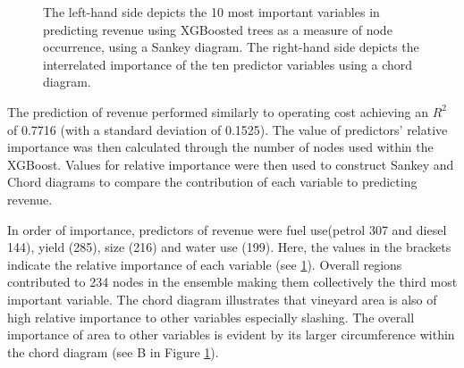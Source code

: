 \documentclass[review,12pt,authoryear]{elsarticle}
\begin{document}
\begin{linenumbers}
 \begin{figure}
  \caption{The left-hand side depicts the 10 most important variables in predicting revenue using XGBoosted trees as a measure of node occurrence, using a Sankey diagram. The right-hand side depicts the interrelated importance of the ten predictor variables using a chord diagram.}\label{fig:revenue_sankey}
 \end{figure}

The prediction of revenue performed similarly to operating cost achieving an $R^2$ of 0.7716 (with a standard deviation of 0.1525). The value of predictors' relative importance was then calculated through the number of nodes used within the XGBoost. Values for relative importance were then used to construct Sankey and Chord diagrams to compare the contribution of each variable to predicting revenue.
\par
In order of importance, predictors of revenue were fuel use(petrol 307 and diesel 144), yield (285), size (216) and water use (199). Here, the values in the brackets indicate the relative importance of each variable (see \ref{fig:revenue_sankey}). Overall regions contributed to 234 nodes in the ensemble making them collectively the third most important variable. The chord diagram illustrates that vineyard area is also of high relative importance to other variables especially slashing. The overall importance of area to other variables is evident by its larger circumference within the chord diagram (see B in Figure \ref{fig:revenue_sankey}).


\end{linenumbers}
\end{document}
